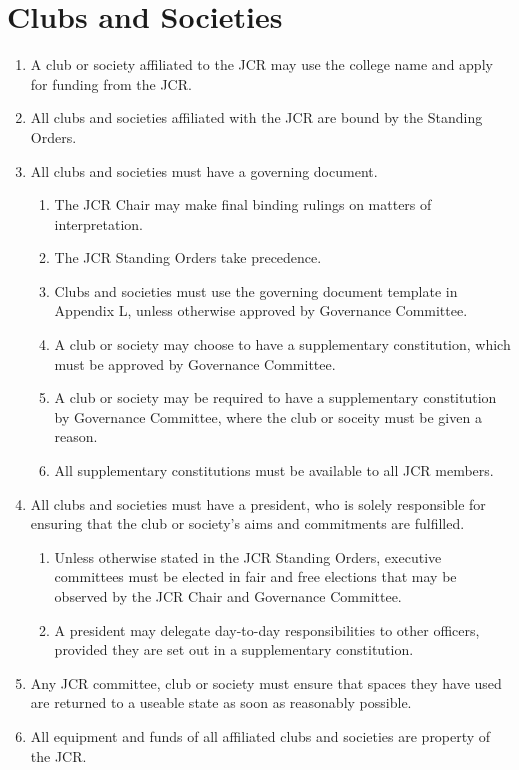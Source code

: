 \documentclass[12pt]{article}
\begin{document}
\section{Clubs and Societies}
\begin{enumerate}
    \item A club or society affiliated to the JCR may use the college name and apply for funding from the JCR.
    \item All clubs and societies affiliated with the JCR are bound by the Standing Orders.
    \item All clubs and societies must have a governing document.
    \begin{enumerate}
        \item The JCR Chair may make final binding rulings on matters of interpretation.
        \item The JCR Standing Orders take precedence.
        \item Clubs and societies must use the governing document template in Appendix L, unless otherwise approved by Governance Committee.
        \item A club or society may choose to have a supplementary constitution, which must be approved by Governance Committee.
        \item A club or society may be required to have a supplementary constitution by Governance Committee, where the club or soceity must be given a reason.
        \item All supplementary constitutions must be available to all JCR members.
    \end{enumerate}
    \item All clubs and societies must have a president, who is solely responsible for ensuring that the club or society's aims and commitments are fulfilled.
    \begin{enumerate}
        \item Unless otherwise stated in the JCR Standing Orders, executive committees must be elected in fair and free elections that may be observed by the JCR Chair and Governance Committee.
        \item A president may delegate day-to-day responsibilities to other officers, provided they are set out in a supplementary constitution.
    \end{enumerate}
    \item Any JCR committee, club or society must ensure that spaces they have used are returned to a useable state as soon as reasonably possible.
    \item All equipment and funds of all affiliated clubs and societies are property of the JCR.

\end{enumerate}
\end{document}
